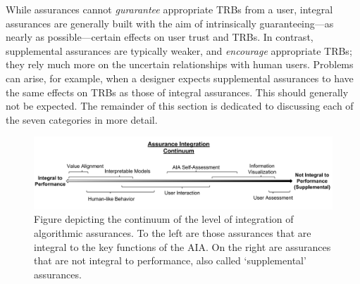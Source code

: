     While assurances cannot \emph{gurarantee} appropriate TRBs from a user, integral assurances are generally built with the aim of intrinsically guaranteeing---as nearly as possible---certain effects on user trust and TRBs. In contrast, supplemental assurances are typically weaker, and \emph{encourage} appropriate TRBs; they rely much more on the uncertain relationships with human users. Problems can arise, for example, when a designer expects supplemental assurances to have the same effects on TRBs as those of integral assurances. This should generally not be expected. The remainder of this section is dedicated to discussing each of the seven categories in more detail.

    \begin{figure}[!t]%
        \centering
        \includegraphics[width=1.0\textwidth]{Figures/Assurance_Integration.pdf}
        \caption{Figure depicting the continuum of the level of integration of algorithmic assurances. To the left are those assurances that are integral to the key functions of the AIA. On the right are assurances that are not integral to performance, also called `supplemental' assurances.}
        \label{fig:assurance_continuum}
    \end{figure}









